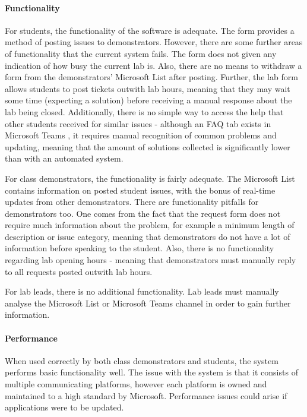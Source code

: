 \documentclass[a4paper,11pt]{article}
\begin{document}
\paragraph{Functionality}
For students, the functionality of the software is adequate. The form provides a method of posting issues to demonstrators. However, there are some further areas of functionality that the current system fails. The form does not given any indication of how busy the current lab is. Also, there are no means to withdraw a form from the demonstrators' Microsoft List after posting. Further, the lab form allows students to post tickets outwith lab hours, meaning that they may wait some time (expecting a solution) before receiving a manual response about the lab being closed. Additionally, there is no simple way to access the help that other students received for similar issues - although an FAQ tab exists in Microsoft Teams \cite{teams}, it requires manual recognition of common problems and updating, meaning that the amount of solutions collected is significantly lower than with an automated system. 
        
For class demonstrators, the functionality is fairly adequate. The Microsoft List contains information on posted student issues, with the bonus of real-time updates from other demonstrators. There are functionality pitfalls for demonstrators too. One comes from the fact that the request form does not require much information about the problem, for example a minimum length of description or issue category, meaning that demonstrators do not have a lot of information before speaking to the student. Also, there is no functionality regarding lab opening hours - meaning that demonstrators must manually reply to all requests posted outwith lab hours.

For lab leads, there is no additional functionality. Lab leads must manually analyse the Microsoft List or Microsoft Teams \cite{teams} channel in order to gain further information. 

\paragraph{Performance}  
When used correctly by both class demonstrators and students, the system performs basic functionality well. The issue with the system is that it consists of multiple communicating platforms, however each platform is owned and maintained to a high standard by Microsoft. Performance issues could arise if applications were to be updated.
\end{document}
